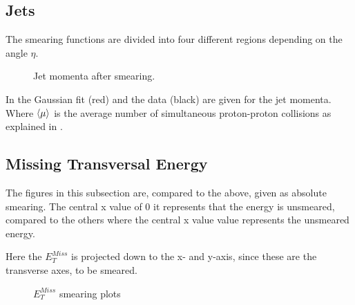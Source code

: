 \subsection{Jets}
The smearing functions are divided into four different regions depending on the angle $\eta$. 
 \begin{figure}[H] %
    \hfill
{}
    \hfill
    \hfill
{}
        \hfill
{}
            \hfill
{}
    \caption{Jet momenta after smearing.}
    \label{fig:jet}
\end{figure}
In  the Gaussian fit (red) and the data (black) are given for the jet momenta. Where $\left<\mu\right>$ is the average number of simultaneous proton-proton collisions as explained in .
\subsection{Missing Transversal Energy}
The figures in this subsection are, compared to the above, given as absolute smearing. The central x value of 0 it represents that the energy is unsmeared, compared to the others where the central x value value represents the unsmeared energy.

Here the $E_T^{Miss}$ is projected down to the x- and y-axis, since these are the transverse axes, to be smeared. 
 \begin{figure}[H] %
    \hfill
        \hfill
   \caption{$E_T^{Miss}$ smearing plots}
    \label{fig:MET}
  \end{figure}
\newpage
